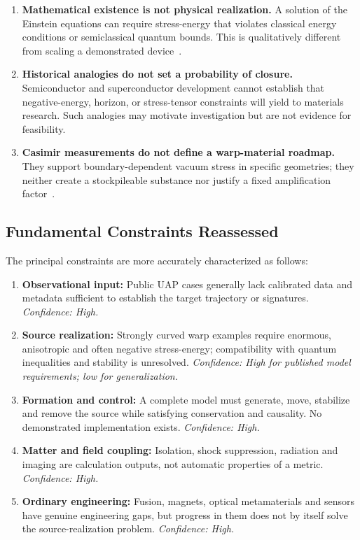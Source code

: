 \documentclass[aps,prd,twocolumn,superscriptaddress,nofootinbib,floatfix]{revtex4-2}
\begin{document}
\begin{enumerate}
  \item \textbf{Mathematical existence is not physical realization.} A solution of
        the Einstein equations can require stress-energy that violates classical
        energy conditions or semiclassical quantum bounds. This is qualitatively
        different from scaling a demonstrated
        device~\cite{PfenningFord1997,SantiagoVisser2022}.
  \item \textbf{Historical analogies do not set a probability of closure.}
        Semiconductor and superconductor development cannot establish that
        negative-energy, horizon, or stress-tensor constraints will yield to
        materials research. Such analogies may motivate investigation but are
        not evidence for feasibility.
  \item \textbf{Casimir measurements do not define a warp-material roadmap.} They
        support boundary-dependent vacuum stress in specific geometries; they
        neither create a stockpileable substance nor justify a fixed
        amplification factor~\cite{PfenningFord1997,Casimir1948}.
\end{enumerate}

\subsection{Fundamental Constraints Reassessed}\label{sec:constraints}

The principal constraints are more accurately characterized as follows:
\begin{enumerate}
  \item \textbf{Observational input:} Public UAP cases generally lack calibrated
        data and metadata sufficient to establish the target trajectory or
        signatures. \emph{Confidence: High.}
  \item \textbf{Source realization:} Strongly curved warp examples require
        enormous, anisotropic and often negative stress-energy; compatibility
        with quantum inequalities and stability is unresolved.
        \emph{Confidence: High for published model requirements; low for
        generalization.}
  \item \textbf{Formation and control:} A complete model must generate, move,
        stabilize and remove the source while satisfying conservation and
        causality. No demonstrated implementation exists. \emph{Confidence:
        High.}
  \item \textbf{Matter and field coupling:} Isolation, shock suppression,
        radiation and imaging are calculation outputs, not automatic properties
        of a metric. \emph{Confidence: High.}
  \item \textbf{Ordinary engineering:} Fusion, magnets, optical metamaterials and
        sensors have genuine engineering gaps, but progress in them does not by
        itself solve the source-realization problem. \emph{Confidence: High.}
\end{enumerate}
\end{document}
